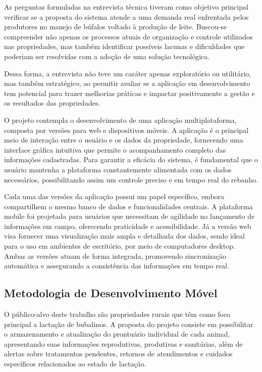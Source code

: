 As perguntas formuladas na entrevista técnica tiveram como objetivo principal verificar se a proposta do sistema atende a uma demanda real enfrentada pelos produtores no manejo de búfalos voltado à produção de leite. Buscou-se compreender não apenas os processos atuais de organização e controle utilizados nas propriedades, mas também identificar possíveis lacunas e dificuldades que poderiam ser resolvidas com a adoção de uma solução tecnológica.

Dessa forma, a entrevista não teve um caráter apenas exploratório ou utilitário, mas também estratégico, ao permitir avaliar se a aplicação em desenvolvimento tem potencial para trazer melhorias práticas e impactar positivamente a gestão e os resultados das propriedades.

O projeto contempla o desenvolvimento de uma aplicação multiplataforma, composta por versões para web e dispositivos móveis. A aplicação é o principal meio de interação entre o usuário e os dados da propriedade, fornecendo uma interface gráfica intuitiva que permite o acompanhamento completo das informações cadastradas. Para garantir a eficácia do sistema, é fundamental que o usuário mantenha a plataforma constantemente alimentada com os dados necessários, possibilitando assim um controle preciso e em tempo real do rebanho.

Cada uma das versões da aplicação possui um papel específico, embora compartilhem o mesmo banco de dados e funcionalidades centrais. A plataforma mobile foi projetada para usuários que necessitam de agilidade no lançamento de informações em campo, oferecendo praticidade e acessibilidade. Já a versão web visa fornecer uma visualização mais ampla e detalhada dos dados, sendo ideal para o uso em ambientes de escritório, por meio de computadores desktop. Ambas as versões atuam de forma integrada, promovendo sincronização automática e assegurando a consistência das informações em tempo real.

\subsection{Metodologia de Desenvolvimento Móvel}

O público-alvo deste trabalho são propriedades rurais que têm como foco principal a lactação de bubalinos. A proposta do projeto consiste em possibilitar o armazenamento e atualização do prontuário individual de cada animal, apresentando suas informações reprodutivas, produtivas e sanitárias, além de alertas sobre tratamentos pendentes, retornos de atendimentos e cuidados específicos relacionados ao estado de lactação.

